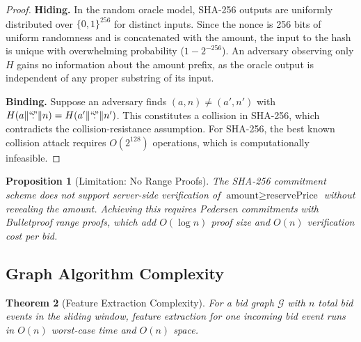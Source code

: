 \documentclass[11pt]{article}
\newtheorem{theorem}{Theorem}
\newtheorem{proposition}[theorem]{Proposition}
\begin{document}
\begin{proof}
\textbf{Hiding.} In the random oracle model, SHA-256 outputs are uniformly
distributed over $\{0,1\}^{256}$ for distinct inputs. Since the nonce is
256 bits of uniform randomness and is concatenated with the amount, the
input to the hash is unique with overwhelming probability
($1 - 2^{-256}$). An adversary observing only $H$ gains no information
about the amount prefix, as the oracle output is independent of any
proper substring of its input.

\textbf{Binding.} Suppose an adversary finds
$(a, n) \neq (a', n')$ with $H(a \| \text{``\!:\!''} \| n) =
H(a' \| \text{``\!:\!''} \| n')$. This constitutes a collision in
SHA-256, which contradicts the collision-resistance assumption. For
SHA-256, the best known collision attack requires $O(2^{128})$ operations,
which is computationally infeasible.
\end{proof}

\begin{proposition}[Limitation: No Range Proofs]
\label{prop:range}
The SHA-256 commitment scheme does not support server-side verification of
$\text{amount} \geq \text{reservePrice}$ without revealing the amount.
Achieving this requires Pedersen commitments with Bulletproof range
proofs, which add $O(\log n)$ proof size and $O(n)$ verification cost
per bid.
\end{proposition}

\subsection{Graph Algorithm Complexity}

\begin{theorem}[Feature Extraction Complexity]
\label{thm:complexity}
For a bid graph $\mathcal{G}$ with $n$ total bid events in the sliding
window, feature extraction for one incoming bid event runs in $O(n)$
worst-case time and $O(n)$ space.
\end{theorem}
\end{document}
